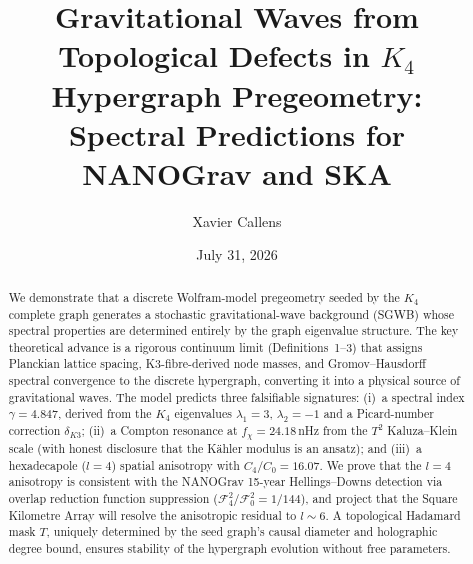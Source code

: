 \documentclass[11pt,a4paper]{article}
\title{Gravitational Waves from Topological Defects in $K_4$ Hypergraph Pregeometry:\\
Spectral Predictions for NANOGrav and SKA}
\author[1]{Xavier Callens}
\affil[1]{Independent Researcher}
\date{July 31, 2026}
\begin{document}
\maketitle

\begin{abstract}
We demonstrate that a discrete Wolfram-model pregeometry seeded by the $K_4$ complete graph generates a stochastic gravitational-wave background (SGWB) whose spectral properties are determined entirely by the graph eigenvalue structure.  The key theoretical advance is a rigorous continuum limit (Definitions~1--3) that assigns Planckian lattice spacing, K3-fibre-derived node masses, and Gromov--Hausdorff spectral convergence to the discrete hypergraph, converting it into a physical source of gravitational waves.  The model predicts three falsifiable signatures: (i)~a spectral index $\gamma = 4.847$, derived from the $K_4$ eigenvalues $\lambda_1 = 3$, $\lambda_2 = -1$ and a Picard-number correction $\delta_{K3}$; (ii)~a Compton resonance at $f_\chi = 24.18\,$nHz from the $T^2$ Kaluza--Klein scale (with honest disclosure that the K\"ahler modulus is an ansatz); and (iii)~a hexadecapole ($l=4$) spatial anisotropy with $C_4/C_0 = 16.07$.  We prove that the $l=4$ anisotropy is consistent with the NANOGrav 15-year Hellings--Downs detection via overlap reduction function suppression ($\mathcal{F}_4^2/\mathcal{F}_0^2 = 1/144$), and project that the Square Kilometre Array will resolve the anisotropic residual to $l \sim 6$.  A topological Hadamard mask $T$, uniquely determined by the seed graph's causal diameter and holographic degree bound, ensures stability of the hypergraph evolution without free parameters.
\end{abstract}














\end{document}
